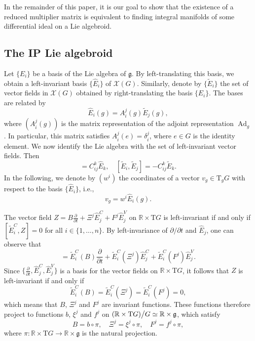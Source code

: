 \documentclass[11pt]{article}
\theoremstyle{plain}
\theoremstyle{definition}
\DeclareMathOperator\Ad{Ad} %
\begin{document}
In the remainder of this paper, it is our goal to show that the existence of a reduced multiplier matrix is equivalent to finding integral manifolds of some differential ideal on a Lie algebroid.


\subsection{The  IP Lie algebroid}\label{subsec:liealgebroidinverse}

Let $\{E_i\}$ be a basis of the Lie algebra of $\mathfrak{g}$. By left-translating this basis, we obtain a left-invariant basis $\{\widehat{E}_i\}$ of $\mathcal{X}(G)$. Similarly, denote by $\{\widetilde{E}_i\}$ the set of vector fields in $\mathcal{X}(G)$ obtained by right-translating the basis $\{E_i\}$. The bases are related by
\begin{equation*}
    \widehat{E}_i(g)=A_i^j(g)\widetilde{E}_j(g),
\end{equation*}
where $(A_i^j(g))$ is the matrix representation of the adjoint representation $\Ad_g$. In particular, this matrix satisfies $A_i^j(e)=\delta_i^j$, where $e\in G$ is the identity element. We now identify the Lie algebra with the set of left-invariant vector fields. Then
\begin{equation*}
    [\widehat{E}_i,\widehat{E}_j]=C_{ij}^k \widehat{E}_k,\quad [\widetilde{E}_i,\widetilde{E}_j]=-C_{ij}^k \widetilde{E}_k.
\end{equation*}
In the following, we denote by $(w^i)$ the coordinates of a vector $v_g\in \mathrm{T}_g G$ with respect to the basis $\{\widehat{E}_i\}$, i.e.,
\begin{equation*}
    v_g=w^i \widehat{E}_i(g).
\end{equation*}

The vector field $Z=B\frac{\partial}{\partial t}+\Xi^j \widehat{E}_j^C+F^j \widehat{E}_j^V$ on $\mathbb{R}\times \mathrm{T}G$ is left-invariant if and only if $[\widetilde{E}_i^C,Z]=0$ for all $i\in \{1,\dots,n\}$. By left-invariance of $\partial/\partial t$ and $\widehat{E}_j$, one can observe that
\begin{equation*}
    [\widetilde{E}_i^C,Z]=\widetilde{E}_i^C(B)\frac{\partial}{\partial t}+\widetilde{E}_i^C(\Xi^j)\widehat{E}_j^C+\widetilde{E}_i^C(F^j)\widehat{E}_j^V.
\end{equation*}
Since $\{\frac{\partial}{\partial t},\widehat{E}_j^C, \widehat{E}_j^V\}$ is a basis for the vector fields on $\mathbb{R}\times \mathrm{T}G$, it follows that $Z$ is left-invariant if and only if
\begin{equation*}
    \widetilde{E}_i^C(B)=\widetilde{E}_i^C(\Xi^j)=\widetilde{E}_i^C(F^j)=0,
\end{equation*}
which means that $B$, $\Xi^j$ and $F^j$ are invariant functions. These functions therefore project to functions $b$, $\xi^j$ and $f^j$ on $(\mathbb{R}\times \mathrm{T}G)\big\slash G\simeq \mathbb{R}\times \mathfrak{g}$, which satisfy
\begin{equation*}
    B=b\circ \pi, \quad \Xi^j=\xi^j\circ \pi,\quad F^j=f^j\circ \pi,
\end{equation*}
where $\pi\colon \mathbb{R}\times \mathrm{T}G\to \mathbb{R}\times \mathfrak{g}$ is the natural projection.
\end{document}
